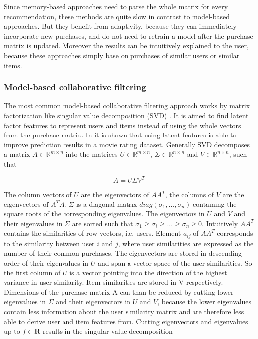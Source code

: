 \documentclass[10pt]{reportMaster}
\begin{document}
Since memory-based approaches need to parse the whole matrix for every recommendation, these methods are quite slow in contrast to model-based approaches.
But they benefit from adaptivity, because they can immediately incorporate new purchases, and do not need to retrain a model after the purchase matrix is updated.
Moreover the results can be intuitively explained to the user, because these approaches simply base on purchases of similar users or similar items.


\subsubsection{Model-based collaborative filtering}
\label{sec:modelBasedCF}
The most common model-based collaborative filtering approach works by matrix factorization like singular value decomposition (SVD) \cite{svdGolubGeneral}.
It is aimed to find latent factor features to represent users and items instead of using the whole vectors from the purchase matrix.
In \cite{SVDNeuralNet} it is shown that using latent features is able to improve prediction results in a movie rating dataset.
Generally SVD decomposes a matrix $A \in \mathds{R}^{m \times n}$ into the matrices $U \in \mathds{R}^{m \times n}$, $\Sigma \in \mathds{R}^{n \times n}$ and $V \in \mathds{R}^{n \times n}$, such that 

$$
A = U \Sigma V^T
$$

The column vectors of $U$ are the eigenvectors of $AA^T$, the columns of $V$ are the eigenvectors of $A^TA$.
$\Sigma$ is a diagonal matrix $diag(\sigma_1, ..., \sigma_n)$ containing the square roots of the corresponding eigenvalues.  %
The eigenvectors in $U$ and $V$ and their eigenvalues in $\Sigma$ are sorted such that $\sigma_1 \geq \sigma_i \geq ... \geq \sigma_n \geq 0$.
Intuitively $AA^T$ contains the similarities of row vectors, i.e. users.
Element $a_{ij}$ of $AA^T$ corresponds to the similarity between user $i$ and $j$, where user similarities are expressed as the number of their common purchases.
The eigenvectors are stored in descending order of their eigenvalues in $U$ and span a vector space of the user similarities.
So the first column of $U$ is a vector pointing into the direction of the highest variance in user similarity. 
Item similarities are stored in V respectively.
Dimensions of the purchase matrix A can than be reduced by cutting lower eigenvalues in $\Sigma$ and their eigenvectors in $U$ and $V$, because the lower eigenvalues contain less information about the user similarity matrix and are therefore less able to derive user and item features from.
Cutting eigenvectors and eigenvalues up to $f \in \mathbf{R}$ results in the singular value decomposition 
\end{document}
